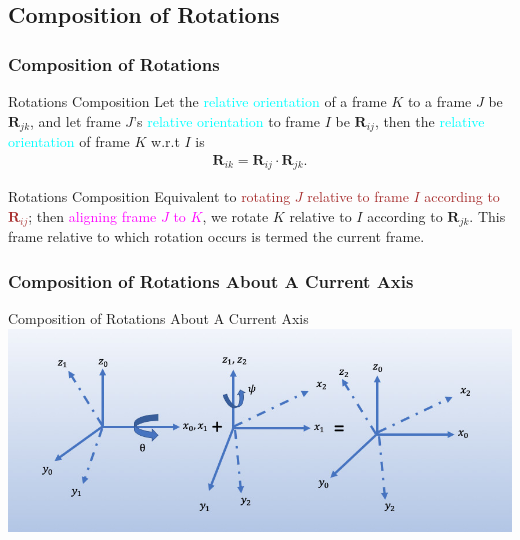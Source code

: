 \subsection{Composition of Rotations}
\begin{frame}
	\frametitle{Composition of Rotations}
			\begin{block}{Rotations Composition}
				Let the \textcolor{cyan}{relative orientation} of a frame $K$  to a frame $J$ be $\bm{R}_{jk}$, and let frame $J$'s  \textcolor{cyan}{relative orientation} to frame $I$ be $\bm{R}_{ij}$, then the \textcolor{cyan}{relative orientation} of frame $K$  w.r.t $I$ is 
				\begin{align}
					\bm{R}_{ik} = \bm{R}_{ij} \cdot \bm{R}_{jk}.
				\end{align} 
			\end{block}
		
		\begin{block}{Rotations Composition}
			Equivalent to \textcolor{brown}{rotating $J$ relative to frame $I$ according to $\bm{R}_{ij}$}; then \textcolor{magenta}{aligning frame $J$  to $K$}, we \textcolor{light-blue}{rotate $K$ relative to $I$ according to $\bm{R}_{jk}$}. This frame relative to which rotation occurs is termed the \textcolor{light-red}{current frame}. 
		\end{block}
\end{frame}


\begin{frame}
	\frametitle{Composition of Rotations About A Current Axis}
	\begin{block}{Composition of Rotations About A Current Axis}
		\centering
		\includegraphics[width=1\textwidth]{../Notes/figures/compoz.jpg}
	\end{block}
\end{frame} 

